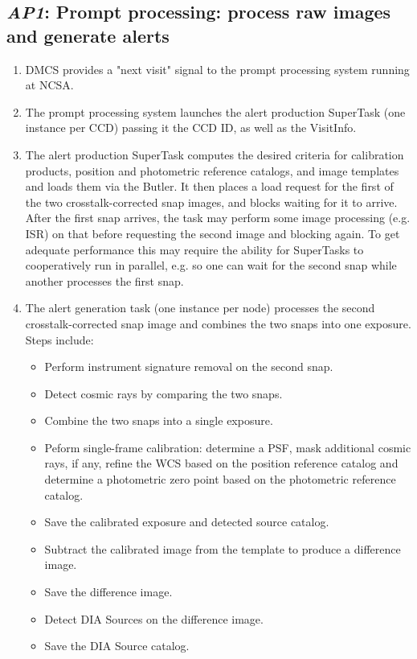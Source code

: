 \documentclass[DM,toc,lsstdraft]{lsstdoc}
\newcommand{\usecase}[3]{%
\subsection{\emph{#1}: #2}
\label{use:#1}
\begin{enumerate}[label=\alph*.]
#3
\end{enumerate}
}
\begin{document}
\usecase{AP1}{Prompt processing: process raw images and generate alerts}{%

\item
DMCS provides a "next visit" signal to the prompt processing system running at NCSA.

\item
The prompt processing system launches the alert production SuperTask (one instance per CCD) passing it the CCD ID, as well as the VisitInfo.

\item
The alert production SuperTask computes the desired criteria for calibration products, position and photometric reference catalogs, and image templates and loads them via the Butler.
It then places a load request for the first of the two crosstalk-corrected snap images, and blocks waiting for it to arrive.
After the first snap arrives, the task may perform some image processing (e.g. ISR) on that before requesting the second image and blocking again.
To get adequate performance this may require the ability for SuperTasks to cooperatively run in parallel, e.g. so one can wait for the second snap while another processes the first snap.

\item
The alert generation task (one instance per node) processes the second crosstalk-corrected snap image and combines the two snaps into one exposure.
Steps include:
\begin{itemize}
\item Perform instrument signature removal on the second snap.
\item Detect cosmic rays by comparing the two snaps.
\item Combine the two snaps into a single exposure.
\item Peform single-frame calibration: determine a PSF, mask additional cosmic rays, if any, refine the WCS based on the position reference catalog and determine a photometric zero point based on the photometric reference catalog.
\item Save the calibrated exposure and detected source catalog.
\item Subtract the calibrated image from the template to produce a difference image.
\item Save the difference image.
\item Detect DIA Sources on the difference image.
\item Save the DIA Source catalog.
\end{itemize}

}
\end{document}
